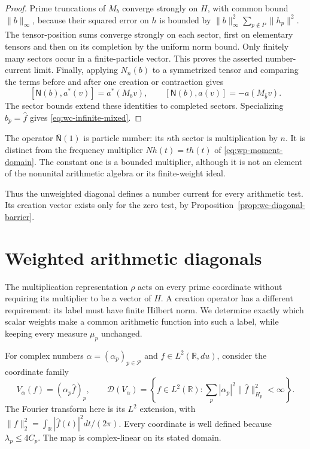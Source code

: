 \documentclass[11pt]{article}
\theoremstyle{definition}
\theoremstyle{remark}
\numberwithin{equation}{section}
\newcommand{\R}{\mathbb R}
\begin{document}
\begin{proof}
Prime truncations of $M_b$ converge strongly on $H$, with common bound
$\|b\|_\infty$, because their squared error on $h$ is bounded by
$\|b\|_\infty^2\sum_{p\notin P}\|h_p\|^2$.
The tensor-position sums converge strongly on each sector, first on
elementary tensors and then on its completion by the uniform norm bound.
Only finitely many sectors occur in a finite-particle vector.
This proves the asserted number-current limit.
Finally, applying $N_n(b)$ to a symmetrized tensor and comparing the
terms before and after one creation or contraction gives
\[
 [\mathsf N(b),a^*(v)]=a^*(M_bv),\qquad
 [\mathsf N(b),a(v)]=-a(M_{\overline b}v).
\]
The sector bounds extend these identities to completed sectors.
Specializing $b_p=\widehat f$ gives \eqref{eq:wc-infinite-mixed}.
\end{proof}

The operator $\overline{\mathsf N}(1)$ is particle number: its $n$th
sector is multiplication by $n$.
It is distinct from the frequency multiplier $Nh(t)=th(t)$ of
\eqref{eq:wp-moment-domain}.
The constant one is a bounded multiplier, although it is not an element
of the nonunital arithmetic algebra or its finite-weight ideal.

Thus the unweighted diagonal defines a number current for every arithmetic
test.  Its creation vector exists only for the zero test, by
Proposition~\ref{prop:wc-diagonal-barrier}.


\section{Weighted arithmetic diagonals}
\label{sec:wc-weighted-diagonal}

The multiplication representation $\rho$ acts on every prime coordinate
without requiring its multiplier to be a vector of $H$.
A creation operator has a different requirement: its label must have
finite Hilbert norm.  We determine exactly which scalar weights make a
common arithmetic function into such a label, while keeping every measure
$\mu_p$ unchanged.

For complex numbers $\alpha=(\alpha_p)_{p\in\mathcal P}$ and
$f\in L^2(\R,du)$, consider the coordinate family
\begin{equation}
 V_\alpha(f)=(\alpha_p\widehat f)_p,\qquad
 \mathcal D(V_\alpha)=
 \left\{f\in L^2(\R):
       \sum_p|\alpha_p|^2\|\widehat f\|_{H_p}^2<\infty\right\}.
 \label{eq:wc-weighted-diagonal}
\end{equation}
The Fourier transform here is its $L^2$ extension, with
$\|f\|_2^2=\int_\R|\widehat f(t)|^2dt/(2\pi)$.
Every coordinate is well defined because $\lambda_p\leq4C_p$.
The map is complex-linear on its stated domain.
\end{document}
